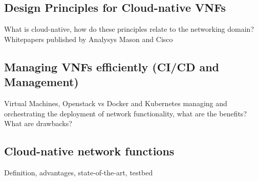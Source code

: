 \subsection{Design Principles for Cloud-native VNFs }
What is cloud-native, how do these principles relate to  the networking domain? Whitepapers published by Analysys Mason \cite{evolutionnfv} and Cisco \cite{CNF}
\subsection{Managing VNFs efficiently (CI/CD and Management)}
Virtual Machines, Openstack vs Docker and Kubernetes managing and orchestrating the deployment of network functionality, what are the benefits? What are drawbacks?
\subsection{Cloud-native network functions}
Definition, advantages, state-of-the-art, testbed 




